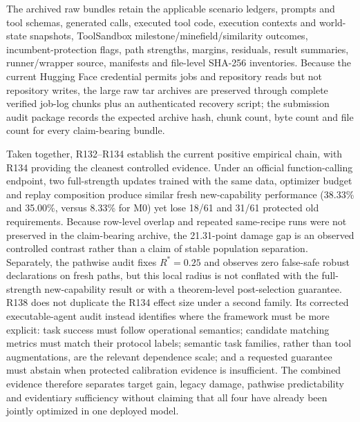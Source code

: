 \documentclass[11pt,letterpaper]{article}
\theoremstyle{plain}
\newcommand{\1}{\mathbf 1}
\begin{document}
The archived raw bundles retain the applicable scenario ledgers, prompts and tool schemas, generated calls, executed tool code, execution contexts and world-state snapshots, ToolSandbox milestone/minefield/similarity outcomes, incumbent-protection flags, path strengths, margins, residuals, result summaries, runner/wrapper source, manifests and file-level SHA-256 inventories. Because the current Hugging Face credential permits jobs and repository reads but not repository writes, the large raw tar archives are preserved through complete verified job-log chunks plus an authenticated recovery script; the submission audit package records the expected archive hash, chunk count, byte count and file count for every claim-bearing bundle.

Taken together, R132--R134 establish the current positive empirical chain, with R134 providing the cleanest controlled evidence. Under an official function-calling endpoint, two full-strength updates trained with the same data, optimizer budget and replay composition produce similar fresh new-capability performance (38.33\% and 35.00\%, versus 8.33\% for M0) yet lose 18/61 and 31/61 protected old requirements. Because row-level overlap and repeated same-recipe runs were not preserved in the claim-bearing archive, the 21.31-point damage gap is an observed controlled contrast rather than a claim of stable population separation. Separately, the pathwise audit fixes $R^*=0.25$ and observes zero false-safe robust declarations on fresh paths, but this local radius is not conflated with the full-strength new-capability result or with a theorem-level post-selection guarantee. R138 does not duplicate the R134 effect size under a second family. Its corrected executable-agent audit instead identifies where the framework must be more explicit: task success must follow operational semantics; candidate matching metrics must match their protocol labels; semantic task families, rather than tool augmentations, are the relevant dependence scale; and a requested guarantee must abstain when protected calibration evidence is insufficient. The combined evidence therefore separates target gain, legacy damage, pathwise predictability and evidentiary sufficiency without claiming that all four have already been jointly optimized in one deployed model.

\clearpage
\end{document}
